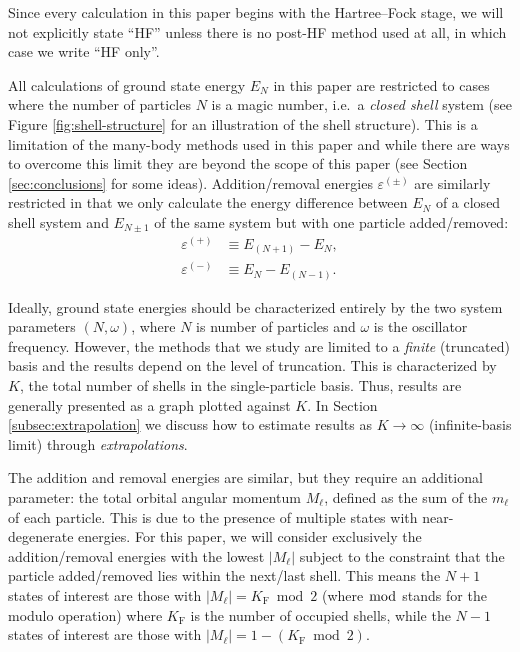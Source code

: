 Since every calculation in this paper begins with the Hartree--Fock stage, we will not explicitly state ``HF'' unless there is no post-HF method used at all, in which case we write ``HF only''.

All calculations of ground state energy $E_N$ in this paper are restricted to cases where the number of particles $N$ is a magic number, i.e.\ a \textit{closed shell} system (see Figure \ref{fig:shell-structure} for an illustration of the shell structure).  This is a limitation of the many-body methods used in this paper and while there are ways to overcome this limit they are beyond the scope of this paper (see Section \ref{sec:conclusions} for some ideas).  Addition/removal energies $\varepsilon^{(\pm)}$ are similarly restricted in that we only calculate the energy difference between $E_N$ of a closed shell system and $E_{N \pm 1}$ of the same system but with one particle added/removed:
\begin{align*}
  \varepsilon^{(+)} &\equiv E_{(N + 1)} - E_N, \\
  \varepsilon^{(-)} &\equiv E_N - E_{(N - 1)}.
\end{align*}

Ideally, ground state energies should be characterized entirely by the two system parameters $(N, \omega)$, where $N$ is number of particles and $\omega$ is the oscillator frequency.  However, the methods that we study are limited to a \emph{finite} (truncated) basis and the results depend on the level of truncation.  This is characterized by $K$, the total number of shells in the single-particle basis.  Thus, results are generally presented as a graph plotted against $K$.  In Section \ref{subsec:extrapolation} we discuss how to estimate results as $K \to \infty$ (infinite-basis limit) through \textit{extrapolations}.

The addition and removal energies are similar, but they require an
additional parameter: the total orbital angular momentum $M_\ell$,
defined as the sum of the $m_\ell$ of each particle.  This is due to
the presence of multiple states with near-degenerate energies.  For
this paper, we will consider exclusively the addition/removal energies
with the lowest $|M_\ell|$ subject to the constraint that the particle
added/removed lies within the next/last shell.  This means the $N + 1$
states of interest are those with $|M_\ell| = K_{\mathrm{F}} \bmod 2$
(where $\bmod$ stands for the modulo operation) where $K_{\mathrm{F}}$
is the number of occupied shells, while the $N - 1$ states of interest
are those with $|M_\ell| = 1 - (K_{\mathrm{F}} \bmod 2)$.

